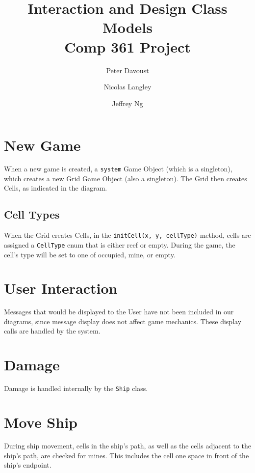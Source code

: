 \documentclass{article}
\title{Interaction and Design Class Models\\
Comp 361 Project}
\author{Peter Davoust \and Nicolas Langley \and Jeffrey Ng}
\begin{document}
\maketitle
\section{New Game}
When a new game is created, a \texttt{system} Game Object (which is a singleton), which creates a new Grid Game Object (also a singleton). The Grid then creates Cells, as indicated in the diagram.\\

\subsection{Cell Types}
When the Grid creates Cells, in the \texttt{initCell(x, y, cellType)} method, cells are assigned a \texttt{CellType} enum that is either reef or empty. During the game, the cell's type will be set to one of occupied, mine, or empty.

\section{User Interaction}
Messages that would be displayed to the User have not been included in our diagrams, since message display does not affect game mechanics. These display calls are handled by the system. 

\section{Damage}
Damage is handled internally by the \texttt{Ship} class.

\section{Move Ship}
During ship movement, cells in the ship's path, as well as the cells adjacent to the ship's path, are checked for mines. This includes the cell one space in front of the ship's endpoint.
\end{document}
